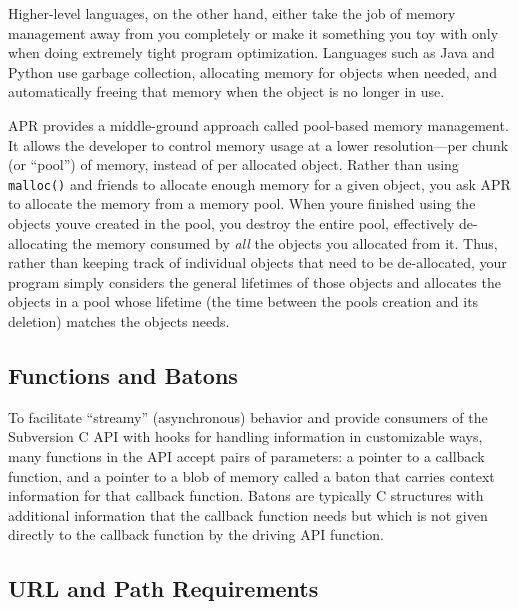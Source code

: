 Higher-level languages, on the other hand, either take the job of memory
management away from you completely or make it something you toy with
only when doing extremely tight program optimization. Languages such as
Java and Python use garbage collection, allocating memory for objects
when needed, and automatically freeing that memory when the object is no
longer in use.

APR provides a middle-ground approach called pool-based memory
management. It allows the developer to control memory usage at a lower
resolution---per chunk (or ``pool'') of memory, instead of per allocated
object. Rather than using \texttt{malloc()} and friends to allocate
enough memory for a given object, you ask APR to allocate the memory
from a memory pool. When you\textquotesingle re finished using the
objects you\textquotesingle ve created in the pool, you destroy the
entire pool, effectively de-allocating the memory consumed by \emph{all}
the objects you allocated from it. Thus, rather than keeping track of
individual objects that need to be de-allocated, your program simply
considers the general lifetimes of those objects and allocates the
objects in a pool whose lifetime (the time between the
pool\textquotesingle s creation and its deletion) matches the
object\textquotesingle s needs.

\subsection{Functions and
Batons}\label{svn.developer.usingapi.funcsbatons}

To facilitate ``streamy'' (asynchronous) behavior and provide consumers
of the Subversion C API with hooks for handling information in
customizable ways, many functions in the API accept pairs of parameters:
a pointer to a callback function, and a pointer to a blob of memory
called a baton that carries context information for that callback
function. Batons are typically C structures with additional information
that the callback function needs but which is not given directly to the
callback function by the driving API function.

\subsection{URL and Path
Requirements}\label{svn.developer.usingapi.urlpath}

